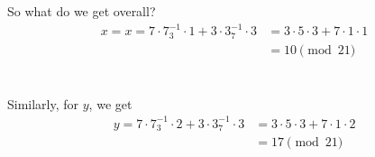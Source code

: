 \documentclass[]{article}
\begin{document}
\begin{qunlist}
{{\begin{enumerate}
      \newpage
      So what do we get overall?
      \begin{align*}
	x = x = 7 \cdot 7^{-1}_3 \cdot 1 + 3 \cdot 3^{-1}_7 \cdot 3 &= 3 \cdot 5 \cdot 3 + 7 \cdot 1 \cdot 1 \\
	&= 10 \pmod {21}
      \end{align*}
      \\\\Similarly, for $y$, we get
      \begin{align*}
	y = 7 \cdot 7^{-1}_3 \cdot 2 + 3 \cdot 3^{-1}_7 \cdot 3 &= 3 \cdot 5 \cdot 3 + 7 \cdot 1 \cdot 2 \\
	&= 17 \pmod{21} \\
      \end{align*}

  \end{enumerate}
}}\fi



\end{qunlist}
\end{document}
